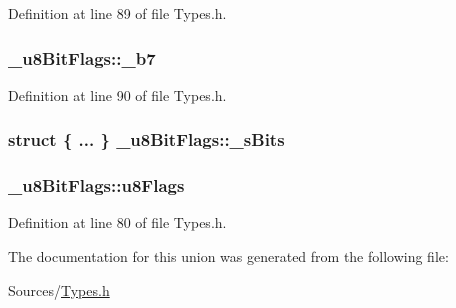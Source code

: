 Definition at line 89 of file Types.\+h.

\subsubsection[{\texorpdfstring{\+\_\+b7}{_b7}}]{ \+\_\+u8\+Bit\+Flags\+::\+\_\+b7}\hypertarget{union__u8_bit_flags_af21bc948213ba27c2bc340f47fdb8f3d}{}\label{union__u8_bit_flags_af21bc948213ba27c2bc340f47fdb8f3d}


Definition at line 90 of file Types.\+h.

\subsubsection[{\texorpdfstring{\+\_\+s\+Bits}{_sBits}}]{\setlength{\rightskip}{0pt plus 5cm}struct \{ ... \}  \+\_\+u8\+Bit\+Flags\+::\+\_\+s\+Bits}\hypertarget{union__u8_bit_flags_adebc7ca89820176fc685134dd1709fc2}{}\label{union__u8_bit_flags_adebc7ca89820176fc685134dd1709fc2}
\subsubsection[{\texorpdfstring{u8\+Flags}{u8Flags}}]{ \+\_\+u8\+Bit\+Flags\+::u8\+Flags}\hypertarget{union__u8_bit_flags_a0cd07a5ca168d474cadc27f8b3ee2334}{}\label{union__u8_bit_flags_a0cd07a5ca168d474cadc27f8b3ee2334}


Definition at line 80 of file Types.\+h.



The documentation for this union was generated from the following file\+:\begin{DoxyCompactItemize}
\item 
Sources/\hyperlink{_types_8h}{Types.\+h}\end{DoxyCompactItemize}
